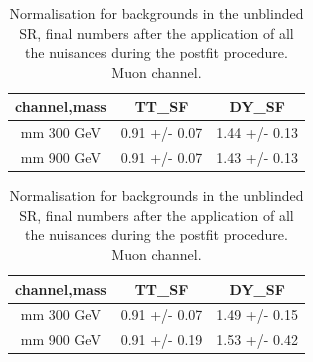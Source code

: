 \begin{table}
\begin{center}
\caption{Normalization for backgrounds, final numbers after the application of all the nuisances during the postfit procedure. Muon channel.}
\begin{tabular}{ | c | c | c | }
  \hline
  channel,mass & TT\_SF & DY\_SF \\
  \hline
  mm 300 GeV   & 0.91 +/- 0.07 & 1.44 +/- 0.13\\
  mm 900 GeV   & 0.91 +/- 0.07 & 1.43 +/- 0.13\\

  \hline
\end{tabular}
\label{normalization_muon}
\end{center}
\begin{center}
\caption{Normalisation for backgrounds in the unblinded SR, final numbers after the application of all the nuisances during the postfit procedure. Muon channel.}

\begin{tabular}{ | c | c | c | }
  \hline
  channel,mass & TT\_SF & DY\_SF \\
  \hline
  mm 300 GeV   &  0.91 +/- 0.07  & 1.49 +/- 0.15\\
  mm 900 GeV   &  0.91 +/- 0.19  & 1.53 +/- 0.42\\

  \hline
\end{tabular}
\label{normalization_muon_SR}
\end{center}
\end{table}





